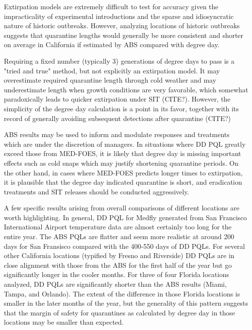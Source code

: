 \documentclass[10pt,a4paper,twocolumn]{article}
\begin{document}

Extirpation models are extremely difficult to test for accuracy given 
the impracticality of experimental introductions and 
the sparse and idiosyncratic nature of historic outbreaks. However, analyzing locations
of historic outbreaks suggests that quarantine lengths would generally be more consistent
and shorter on average in California if estimated by ABS compared with degree day. 

Requiring a fixed number (typically 3) generations of degree days to pass is 
a "tried and true" method, but not explicitly an extirpation model.
It may overestimate required quarantine length through cold weather\cite{??}
and may underestimate length when growth conditions are very favorable, 
which somewhat paradoxically leads to quicker extirpation under SIT (CITE?).
However, the simplicity of the degree day calculation is a point in its favor, together with 
its record of generally avoiding subsequent detections after quarantine (CITE?)

ABS results may be used to inform and modulate responses and treatments which are under
the discretion of managers.
In situations where DD PQL greatly exceed those from MED-FOES, it is likely
that degree day is missing important effects such as cold snaps which may justify
shortening quarantine periods.
On the other hand, in cases where MED-FOES predicts longer times to extirpation, it
is plausible that the degree day indicated quarantine is short, and 
eradication treatments and SIT releases should be conducted aggressively.


A few specific results arising from overall comparisons of different locations are worth highlighting. 
In general, DD PQL for Medfly 
generated from San Francisco International Airport temperature data
 are almost certainly too long for the entire year.
The ABS PQLs are flatter and seem more realistic at around 200 days for San
Fransisco compared with the 400-550 days of DD PQLs. 
For several other California locations (typified by Fresno and 
Riverside) DD PQLs are in close alignment with those from the ABS 
for the first half of the year 
but go significantly longer in the cooler months. 
For three of four Florida locations analyzed, 
DD PQLs are significantly shorter than the ABS results
 (Miami, Tampa, and Orlando).
The extent of the difference in those Florida locations is smaller in the later months of the year,
but the generality of this pattern suggests that the margin of safety for quarantines as 
calculated by degree day in those locations may be smaller than expected. 
\end{document}
